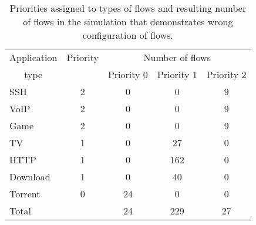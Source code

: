 \begin{table}
	\centering
	\begin{tabular}{@{}l|cccc@{}}
		\toprule
		\multicolumn{1}{c|}{Application} & Priority & \multicolumn{3}{c}{Number of flows}   \\
		\multicolumn{1}{c|}{type}        &          & Priority 0 & Priority 1 & Priority 2  \\ \midrule
		SSH                              &    2     &     0      &     0      &     9       \\
		VoIP                             &    2     &     0      &     0      &     9       \\
		Game                             &    2     &     0      &     0      &     9       \\
		TV                               &    1     &     0      &     27     &     0       \\
		HTTP                             &    1     &     0      &    162     &     0       \\
		Download                         &    1     &     0      &     40     &     0       \\
		Torrent                          &    0     &     24     &     0      &     0       \\ \midrule
		Total                            &          &     24     &    229     &     27      \\ \bottomrule
	\end{tabular}
	\caption{Priorities assigned to types of flows and resulting number of flows in the simulation that demonstrates wrong configuration of flows.}
	\label{tab:flows_count_B}
\end{table}